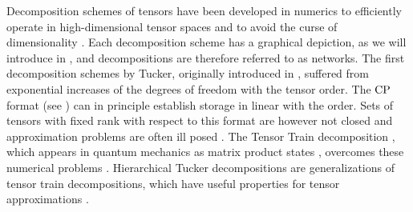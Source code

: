 
Decomposition schemes of tensors have been developed in numerics to efficiently operate in high-dimensional tensor spaces \cite{hackbusch_tensor_2012} and to avoid the curse of dimensionality \cite{bellman_adaptive_1961}.
Each decomposition scheme has a graphical depiction, as we will introduce in , and decompositions are therefore referred to as networks.
The first decomposition schemes by Tucker, originally introduced in \cite{hitchcock_expression_1927}, suffered from exponential increases of the degrees of freedom with the tensor order.
The $\mathrm{CP}$ format (see ) can in principle establish storage in linear with the order.
Sets of tensors with fixed rank with respect to this format are however not closed \cite{beylkin_algorithms_2005} and approximation problems are often ill posed \cite{de_silva_tensor_2008}.
The Tensor Train decomposition \cite{oseledets_breaking_2009}, which appears in quantum mechanics as matrix product states \cite{perez-garcia_matrix_2007}, overcomes these numerical problems \cite{holtz_manifolds_2012}.
Hierarchical Tucker decompositions \cite{hackbusch_new_2009} are generalizations of tensor train decompositions, which have useful properties for tensor approximations \cite{grasedyck_hierarchical_2010,falco_minimal_2012}.

